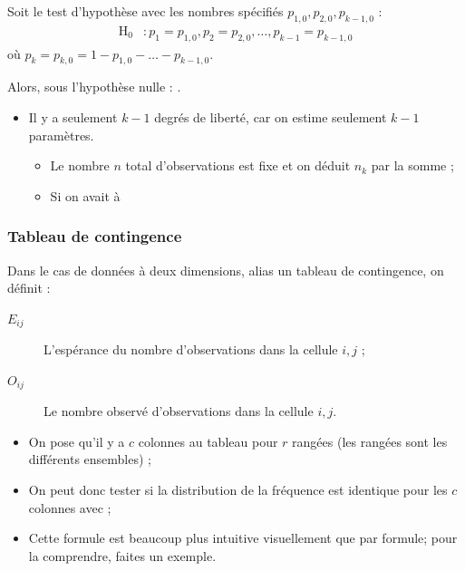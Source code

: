\documentclass[10pt, french]{article}
\begin{document}
\begin{multicols*}{2}
Soit le test d'hypothèse avec les nombres spécifiés $p_{1,0}, p_{2,0}, p_{k - 1,0}$ :
\begin{align*}
	\mathrm{H}_{0}	&:	
	p_{1}	=	p_{1,0}, p_{2}	=	p_{2,0},	 \dots, p_{k - 1}	=	p_{k - 1,0}
\end{align*}
où $p_{k}	=	p_{k,0}	=	1	-	p_{1,0}	-	\hdots	-	p_{k - 1,0}$.

Alors, sous l'hypothèse nulle : .
\begin{itemize}
	\item	Il y a seulement $k - 1$ degrés de liberté, car on estime seulement $k - 1$ paramètres.
		\begin{itemize}
		\item	Le nombre $n$ total d'observations est fixe et on déduit $n_{k}$ par la somme ;
		\item	Si on avait à 
		\end{itemize}
\end{itemize}


\subsubsection{Tableau de contingence}
Dans le cas de données à deux dimensions, alias un tableau de contingence, on définit :
\begin{description}
	\item[$E_{ij}$]	L'espérance du nombre d'observations dans la cellule $i, j$ ;
	\item[$O_{ij}$]	Le nombre observé d'observations dans la cellule $i, j$.
\end{description}

\begin{itemize}
	\item	On pose qu'il y a $c$ colonnes au tableau pour $r$ rangées (les rangées sont les différents ensembles) ;
	\item	On peut donc tester si la distribution de la fréquence est identique pour les $c$ colonnes avec  ;
	\item	Cette formule est beaucoup plus intuitive visuellement que par formule; pour la comprendre, faites un exemple.
\end{itemize}


\end{multicols*}
\end{document}
